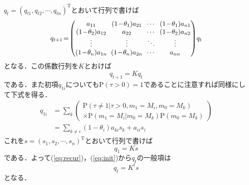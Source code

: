 $ q_t = (q_{t 1} , q_{t 2} , \cdots , q_{t n})^\mathrm{T} $とおいて行列で書けば
\begin{equation*}
    \arraycolsep3pt
    q_{t + 1} \! = \!
    \begin{pmatrix}
        a_{1 1} & (1 \! - \! \theta_1) a_{2 1} & \cdots & (1 \! - \! \theta_1) a_{n 1} \\
        (1 \! - \! \theta_2) a_{1 2} & a_{2 2} & \cdots & (1 \! - \! \theta_2) a_{n 2} \\
        \vdots & \vdots & \ddots & \vdots \\
        (1 \! - \! \theta_n) a_{1 n} & (1 \! - \! \theta_n) a_{2 n} & \cdots & a_{n n} \\
    \end{pmatrix}
    \! q_t
\end{equation*}
となる．この係数行列を$ K $とおけば
\begin{equation} \label{eq:recur}
    q_{t + 1} = K q_t
\end{equation}
である．また初項$ q_{1 i} $についても$ \mathrm{P}(\tau > 0) = 1 $であることに注意すれば同様にして下式を得る．
\begin{align*}
    q_{1 i} & = \! \sum_{k} \left(
        \begin{array}{l}
            \mathrm{P}(\tau \ne 1 | \tau > 0 , m_1 = M_i , m_0 = M_k) \\
            \times \mathrm{P}(m_1 = M_i | m_0 = M_k) \mathrm{P}(m_0 = M_k)
        \end{array}
    \right) \\
    & = \! \sum_{k \ne i} (1 - \theta_i) a_{k i} s_k + a_{i i} s_i
\end{align*}
これを$ s = (s_1 , s_2 , \cdots , s_n)^\mathrm{T} $とおいて行列で書けば
\begin{equation} \label{eq:init}
    q_1 = K s
\end{equation}
である．よって(\ref{eq:recur})，(\ref{eq:init})から$ q_t $の一般項は
\begin{equation} \label{eq:qt}
    q_t = K^t s
\end{equation}
となる．

